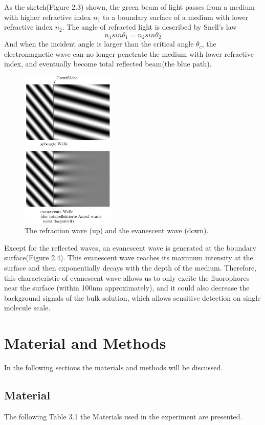 \documentclass[a4paper,english,12pt,bibliography=totoc]{scrreprt}
\begin{document}
As the sketch(Figure 2.3) shown, the green beam of light passes from a medium with higher refractive index $n_1$ to a boundary surface of a medium with lower refractive index $n_2$. The angle of refracted light is described by Snell's law
\[
n_1 sin\theta_1 = n_2 sin\theta_2
\]
And when the incident angle is larger than the critical angle $\theta_c$, the electromagnetic wave can no longer penetrate the medium with lower refractive index, and eventually become total reflected beam(the blue path).\\
\begin{figure}
    \centering
    \includegraphics[width = 0.4\textwidth]{images/Evanescent_wave.jpg}
    \caption{The refraction wave (up) and the evanescent wave (down). \cite{article}}
\end{figure}
Except for the reflected waves, an evanescent wave is generated at the boundary surface(Figure 2.4). This evanescent wave reaches its maximum intensity at the surface and then exponentially decays with the depth of the medium. Therefore, this characteristic of evanescent wave allows us to only excite the fluorophores near the surface (within 100nm approximately), and it could also decrease the background signals of the bulk solution, which allows sensitive detection on single molecule scale.
\chapter{Material and Methods}
\label{cha:MaterialandMethods}
In the following sections the materials and methods will be discussed.
\section{Material}
\label{sec:material}
The following Table 3.1 the Materials used in the experiment are presented. 
\end{document}
